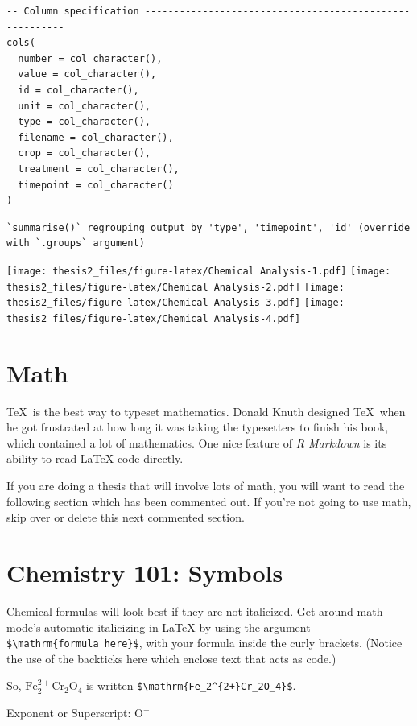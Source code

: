 \documentclass[twoside,12pt,final]{ucthesis-CA2012}
\begin{document}
\begin{ucmainmatter}
\begin{verbatim}
-- Column specification --------------------------------------------------------
cols(
  number = col_character(),
  value = col_character(),
  id = col_character(),
  unit = col_character(),
  type = col_character(),
  filename = col_character(),
  crop = col_character(),
  treatment = col_character(),
  timepoint = col_character()
)
\end{verbatim}
\begin{verbatim}
`summarise()` regrouping output by 'type', 'timepoint', 'id' (override with `.groups` argument)
\end{verbatim}
\texttt{[image: thesis2\_files/figure-latex/Chemical Analysis-1.pdf]} \texttt{[image: thesis2\_files/figure-latex/Chemical Analysis-2.pdf]} \texttt{[image: thesis2\_files/figure-latex/Chemical Analysis-3.pdf]} \texttt{[image: thesis2\_files/figure-latex/Chemical Analysis-4.pdf]}

\hypertarget{math}{%
\section{Math}\label{math}}

\TeX~is the best way to typeset mathematics. Donald Knuth designed \TeX~when he got frustrated at how long it was taking the typesetters to finish his book, which contained a lot of mathematics. One nice feature of \emph{R Markdown} is its ability to read LaTeX code directly.

If you are doing a thesis that will involve lots of math, you will want to read the following section which has been commented out. If you're not going to use math, skip over or delete this next commented section.

\hypertarget{chemistry-101-symbols}{%
\section{Chemistry 101: Symbols}\label{chemistry-101-symbols}}

Chemical formulas will look best if they are not italicized. Get around math mode's automatic italicizing in LaTeX by using the argument \texttt{\$\textbackslash{}mathrm\{formula\ here\}\$}, with your formula inside the curly brackets. (Notice the use of the backticks here which enclose text that acts as code.)

So, \(\mathrm{Fe_2^{2+}Cr_2O_4}\) is written \texttt{\$\textbackslash{}mathrm\{Fe\_2\^{}\{2+\}Cr\_2O\_4\}\$}.

\noindent Exponent or Superscript: \(\mathrm{O^-}\)


\end{ucmainmatter}
\end{document}
